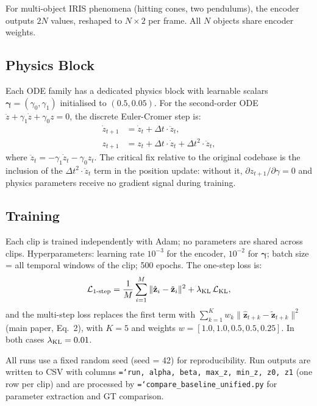 \documentclass[runningheads]{llncs}
\newcommand{\ttt}[1]{\texttt{\hyphenchar\font=`\-\relax #1}}
\begin{document}
For multi-object IRIS phenomena (hitting cones, two pendulums), the encoder
outputs $2N$ values, reshaped to $N \times 2$ per frame. All $N$ objects
share encoder weights.

\subsection{Physics Block}
\label{app:physics_block}

Each ODE family has a dedicated physics block with learnable scalars
$\boldsymbol{\gamma} = (\gamma_0, \gamma_1)$ initialised to $(0.5, 0.05)$.
For the second-order ODE $\ddot{z} + \gamma_1\dot{z} + \gamma_0 z = 0$,
the discrete Euler-Cromer step is:
%
\begin{align}
  \dot{z}_{t+1} &= \dot{z}_t + \Delta t \cdot \ddot{z}_t, \\
  z_{t+1}       &= z_t     + \Delta t \cdot \dot{z}_t
                           + \Delta t^2 \cdot \ddot{z}_t,
\end{align}
%
where $\ddot{z}_t = -\gamma_1\dot{z}_t - \gamma_0 z_t$.  The critical fix
relative to the original codebase is the inclusion of the
$\Delta t^2 \cdot \ddot{z}_t$ term in the position update: without it,
$\partial z_{t+1}/\partial \gamma = 0$ and physics parameters receive no
gradient signal during training.

\subsection{Training}
\label{app:training}

Each clip is trained independently with Adam; no parameters are shared
across clips. Hyperparameters: learning rate $10^{-3}$ for the encoder,
$10^{-2}$ for $\boldsymbol{\gamma}$; batch size = all temporal windows of
the clip; 500 epochs. The one-step loss is:
%
\[
  \mathcal{L}_{\rm 1\text{-}step}
    = \frac{1}{M}\sum_{i=1}^{M}\|\hat{\mathbf{z}}_i - \tilde{\mathbf{z}}_i\|^2
    + \lambda_{\rm KL}\,\mathcal{L}_{\rm KL},
\]
%
and the multi-step loss replaces the first term with
$\sum_{k=1}^{K} w_k \|\hat{\mathbf{z}}_{t+k} - \tilde{\mathbf{z}}_{t+k}\|^2$
(main paper, Eq.~2), with $K = 5$ and weights
$w = [1.0, 1.0, 0.5, 0.5, 0.25]$.
In both cases $\lambda_{\rm KL} = 0.01$.

All runs use a fixed random seed (seed = 42) for reproducibility.
Run outputs are written to CSV with columns
\ttt{run, alpha, beta, max\_z, min\_z, z0, z1} (one row per clip) and
are processed by \ttt{compare\_baseline\_unified.py} for parameter
extraction and GT comparison.
\end{document}
